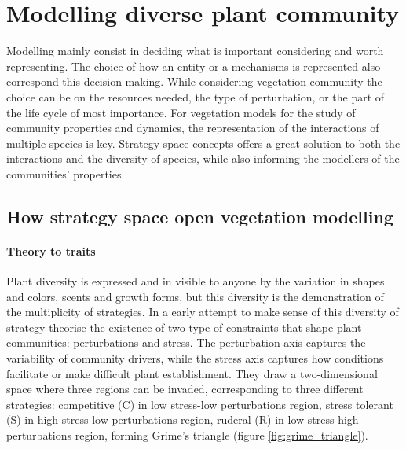 


\section{Modelling diverse plant community}

Modelling mainly consist in deciding what is important considering and worth representing. The choice of how an entity or a mechanisms is represented also correspond this decision making. While considering vegetation community the choice can be on the resources needed, the type of perturbation, or the part of the life cycle of most importance. For vegetation models for the study of community properties and dynamics, the representation of the interactions of multiple species is key. Strategy space concepts offers a great solution to both the interactions and the diversity of species, while also informing the modellers of the communities' properties.

\subsection{How strategy space open vegetation modelling}


\paragraph{Theory to traits}

Plant diversity is expressed and in visible to anyone by the variation in shapes and colors, scents and growth forms, but this diversity is the demonstration of the multiplicity of strategies. In a early attempt to make sense of this diversity of strategy \cite{grime_evidence_1977} theorise the existence of two type of constraints that shape plant communities: perturbations and stress. The perturbation axis captures the variability of community drivers, while the stress axis captures how conditions facilitate or make difficult plant establishment. They draw a two-dimensional space where three regions can be invaded, corresponding to three different strategies: competitive (C) in low stress-low perturbations region, stress tolerant (S) in high stress-low perturbations region, ruderal (R) in low stress-high perturbations region, forming Grime's triangle (\see figure \ref{fig:grime_triangle}).

